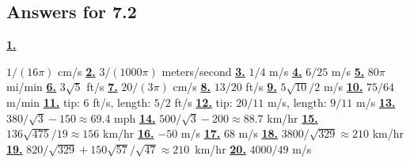 \subsection *{Answers for 7.2}
\hypertarget {a:7.2.1}{\hyperlink {e:7.2.1}{\bfseries 1.}} \mdseries $1/(16\pi )$ cm/s\qquad 
\hypertarget {a:7.2.2}{\hyperlink {e:7.2.2}{\bfseries 2.}} \mdseries $3/(1000\pi )$ meters/second\qquad 
\hypertarget {a:7.2.3}{\hyperlink {e:7.2.3}{\bfseries 3.}} \mdseries $1/4$ m/s\qquad 
\hypertarget {a:7.2.4}{\hyperlink {e:7.2.4}{\bfseries 4.}} \mdseries $6/25$ m/s\qquad 
\hypertarget {a:7.2.5}{\hyperlink {e:7.2.5}{\bfseries 5.}} \mdseries $80\pi $ mi/min\qquad 
\hypertarget {a:7.2.6}{\hyperlink {e:7.2.6}{\bfseries 6.}} \mdseries $3\sqrt 5$ ft/s\qquad 
\hypertarget {a:7.2.7}{\hyperlink {e:7.2.7}{\bfseries 7.}} \mdseries $20/(3\pi )$ cm/s\qquad 
\hypertarget {a:7.2.8}{\hyperlink {e:7.2.8}{\bfseries 8.}} \mdseries $13/20$ ft/s\qquad 
\hypertarget {a:7.2.9}{\hyperlink {e:7.2.9}{\bfseries 9.}} \mdseries $5\sqrt {10}/2$ m/s\qquad 
\hypertarget {a:7.2.10}{\hyperlink {e:7.2.10}{\bfseries 10.}} \mdseries $75/64$ m/min\qquad 
\hypertarget {a:7.2.11}{\hyperlink {e:7.2.11}{\bfseries 11.}} \mdseries tip: 6 ft/s, length: $5/2$ ft/s\qquad 
\hypertarget {a:7.2.12}{\hyperlink {e:7.2.12}{\bfseries 12.}} \mdseries tip: $20/11$ m/s, length: $9/11$ m/s\qquad 
\hypertarget {a:7.2.13}{\hyperlink {e:7.2.13}{\bfseries 13.}} \mdseries $380/\sqrt 3-150\approx 69.4$ mph\qquad 
\hypertarget {a:7.2.14}{\hyperlink {e:7.2.14}{\bfseries 14.}} \mdseries $500/\sqrt 3-200\approx 88.7$ km/hr\qquad 
\hypertarget {a:7.2.15}{\hyperlink {e:7.2.15}{\bfseries 15.}} \mdseries $136\sqrt {475}/19\approx 156$ km/hr\qquad 
\hypertarget {a:7.2.16}{\hyperlink {e:7.2.16}{\bfseries 16.}} \mdseries $-50$ m/s\qquad 
\hypertarget {a:7.2.17}{\hyperlink {e:7.2.17}{\bfseries 17.}} \mdseries $68$ m/s\qquad 
\hypertarget {a:7.2.18}{\hyperlink {e:7.2.18}{\bfseries 18.}} \mdseries $3800/\sqrt {329}\approx 210$ km/hr\qquad 
\hypertarget {a:7.2.19}{\hyperlink {e:7.2.19}{\bfseries 19.}} \mdseries \hbox {$820/\sqrt {329}+150\sqrt {57}/\sqrt {47}\approx 210$ km/hr}\qquad 
\hypertarget {a:7.2.20}{\hyperlink {e:7.2.20}{\bfseries 20.}} \mdseries $4000/49$ m/s\qquad 
